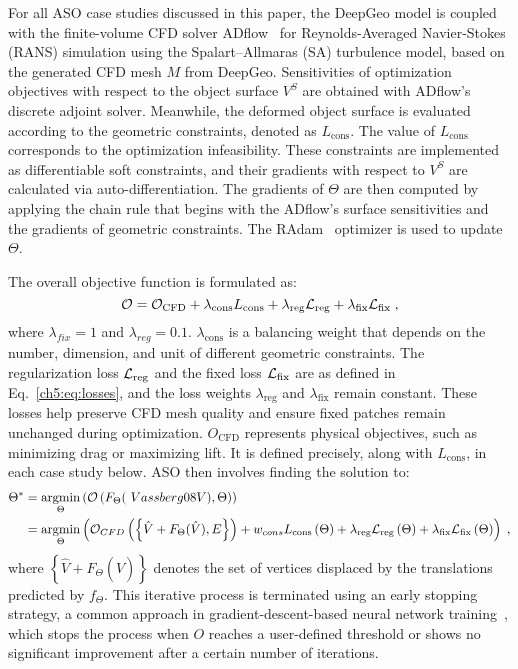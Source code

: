 For all ASO case studies discussed in this paper, the DeepGeo model is coupled with the finite-volume CFD solver ADflow~\cite{aa.Mader2020} for Reynolds-Averaged Navier-Stokes (RANS) simulation using the Spalart–Allmaras (SA) turbulence model, based on the generated CFD mesh $M$ from DeepGeo.
Sensitivities of optimization objectives with respect to the object surface $V^S$ are obtained with ADflow's discrete adjoint solver.
Meanwhile, the deformed object surface is evaluated according to the geometric constraints, denoted as $L_\text{cons}$.
The value of $L_\text{cons}$ corresponds to the optimization infeasibility.
These constraints are implemented as differentiable soft constraints, and their gradients with respect to $V^S$ are calculated via auto-differentiation.
The gradients of $\Theta$ are then computed by applying the chain rule that begins with the ADflow's surface sensitivities and the gradients of geometric constraints. The RAdam~\cite{ai.Liu2020h} optimizer is used to update $\Theta$.

The overall objective function is formulated as:
%
\begin{equation}
    \mathcal{O} = \mathcal{O}_{\rm CFD} + \lambda_{\text{cons}}L_{\rm cons} + \lambda_{\text{reg}}\mathcal{L}_{\rm reg} + \lambda_{\text{fix}}\mathcal{L}_{\rm fix}\;, \label{ch5:eq:asoObj}
\end{equation}
%
where $\lambda_{fix}=1$ and $\lambda_{reg}=0.1$. $\lambda_{\text{cons}}$ is a balancing weight that depends on the number, dimension, and unit of different geometric constraints. 
The regularization loss $\mathcal{L}_{\rm reg}$ and the fixed loss $\mathcal{L}_{\rm fix}$ are as defined in  Eq.~\ref{ch5:eq:losses}, and the loss weights $ \lambda_{\text{reg}}$ and  $\lambda_{\text{fix}}$ remain constant. 
These losses help preserve CFD mesh quality and ensure fixed patches remain unchanged during optimization.
$O_{\text{CFD}}$ represents physical objectives, such as minimizing drag or maximizing lift. 
It is defined precisely, along with $L_\text{cons}$, in each case study below. 
ASO then involves finding the solution to:
%
\begin{align}
    \Theta^* &=  \argmin_{\Theta} \left(
        \cO\left(F_{\Theta}(\ Vassberg08{V}), \Theta\right)
    \right) \nonumber \\
    &= \argmin_{\Theta} \left(
        \cO_{CFD}\left(\left\{\hat{V} + F_{\Theta}(\hat{V}), E\right\}\right) 
        + w_{cons}L_{\rm cons} \left( \Theta \right)
        + \lambda_{\rm reg} \cL_{\rm reg} \left(\Theta \right)
        + \lambda_{\rm fix}  \cL_{\rm fix} \left(\Theta \right)
    \right)
    \; ,
\end{align}
%
where $\left\{ \hat{V} + F_{\Theta}(\hat{V}) \right\}$ denotes the set of vertices displaced by the translations predicted by $f_{\Theta}$. This iterative process is terminated using an early stopping strategy, a common approach in gradient-descent-based neural network training~\cite{ai.Morgan1989}, which stops the process when $O$ reaches a user-defined threshold or shows no significant improvement after a certain number of iterations.

